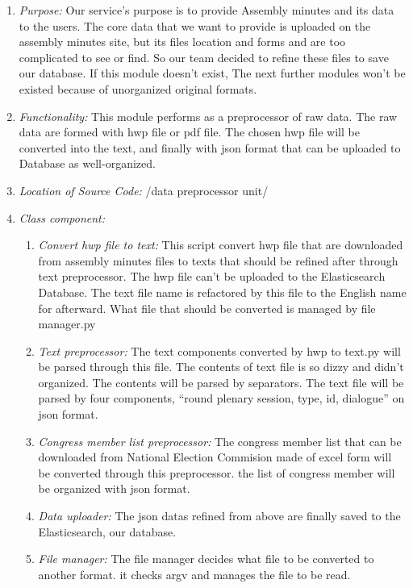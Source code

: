 \documentclass[conference]{IEEEtran}
\begin{document}
\begin{enumerate}
  \item \textit{Purpose: } Our service’s purpose is to  provide Assembly minutes and its data to the users. The core data that we want to provide is uploaded on the assembly minutes site, but its files location and forms and are too complicated to see or find. So our team decided to refine these files to save our database. If this module doesn’t exist, The next further modules won’t be existed because of unorganized original formats.\\
 
  \item \textit{Functionality: } This module performs as a preprocessor of raw data. The raw data are formed with hwp file or pdf file. The chosen hwp file will be converted into the text, and finally with json format that can be uploaded to Database as well-organized.\

  \item \textit{Location of Source Code: } /data preprocessor unit/\\

  \item \textit{Class component: }
  \begin{enumerate}
\item \textit {Convert hwp file to text: }  This script convert hwp file that are downloaded from assembly minutes files to texts that should be refined after through text preprocessor. The hwp file can’t be uploaded to the Elasticsearch Database. The text file name is refactored by this file to the English name for afterward. What file that should be converted is managed by file manager.py\

\item \textit {Text preprocessor: }  The text components converted by hwp to text.py will be parsed through this file. The contents of text file is so dizzy and didn’t organized. The contents will be parsed by  separators. The text file will be parsed by four components, “round plenary session, type, id, dialogue” on json format.\

\item \textit {Congress member list preprocessor: }  The congress member list that can be downloaded from National Election Commision made of excel form will be converted through this preprocessor. the list of congress member will be organized with json format.\

\item \textit {Data uploader: }  The json datas refined from above are finally saved to the Elasticsearch, our database.\
\item \textit {File manager: }  The file manager decides what file to be converted to another format. it checks argv and manages the file to be read.\


\end{enumerate}
\end{enumerate}
\end{document}
